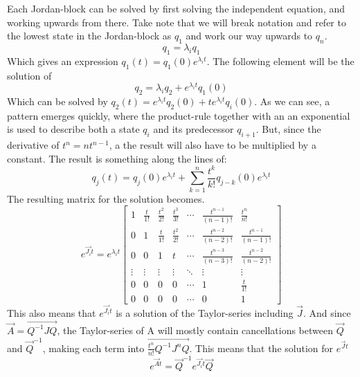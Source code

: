 Each Jordan-block can be solved by first solving the independent equation, and working upwards from there. Take note that we will break notation and refer to the lowest state in the Jordan-block as $q_1$ and work our way upwards to $q_n$. 
\begin{equation}
    q_1 = \lambda_i q_1 
\end{equation}
Which gives an expression $q_1(t)= q_1(0) e^{\lambda_i t}$. The following element will be the solution of 
\begin{equation}
    q_2 = \lambda_i q_2 + e^{\lambda_i t}q_1(0)
\end{equation}
Which can be solved by $q_2(t)  = e^{\lambda_i t}q_2(0) + t e^{\lambda_i t}q_i(0)$. As we can see, a pattern emerges quickly, where the product-rule together with an an exponential is used to describe both a state $q_i$ and its predecessor $q_{i+1}$. But, since the derivative of $t^n = nt^{n-1}$, a the result will also have to be multiplied by a constant. The result is something along the lines of: 
\begin{equation}
    q_{j}(t) = q_j(0)e^{\lambda_i t} + \sum_{k=1}^n \frac{t^{k}}{k!}q_{j-k}(0)e^{\lambda_i t} 
\end{equation}
The resulting matrix for the solution becomes. 
\begin{equation}
    e^{\Vec{J_i} t } = e^{\lambda_i t} 
    \begin{bmatrix}
        1      & \frac{t}{1!} & \frac{t^2}{2!} & \frac{t^3}{3!} &\cdots  & \frac{t^{n-1}}{(n-1)!} & \frac{t^n}{n!}\\
        0      & 1            & \frac{t}{1!}   &\frac{t^2}{2!}  & \cdots & \frac{t^{n-2}}{(n-2)!} & \frac{t^{n-1}}{(n-1)!}\\
        0      & 0            & 1              & t              & \cdots & \frac{t^{n-3}}{(n-3)!} & \frac{t^{n-2}}{(n-2)!} \\
        \vdots & \vdots       & \vdots         &\vdots          & \ddots & \vdots                   & \vdots \\
        0      & 0            & 0              & 0              & \cdots & 1                        & \frac{t}{1!} \\
        0      & 0            & 0              &0               & \cdots & 0                        & 1
    \end{bmatrix}
\end{equation}
This also means that $e^{\Vec{J_i} t }$ is a solution of the Taylor-series including $\Vec{J}$. And since $\Vec{A}= \Vec{Q^{-1}JQ}$, the Taylor-series of A will mostly contain cancellations between $\Vec{Q}$ and $\Vec{Q}^{-1}$, making each term into $\Vec{\frac{t^n}{n!} Q^{-1}J^nQ}$. This means that the solution for $e^{\Vec{J}t}$
\begin{equation}
    e^{\Vec{A}t} = \Vec{Q}^{-1}e^{\Vec{J_i} t }\Vec{Q} 
\end{equation}

